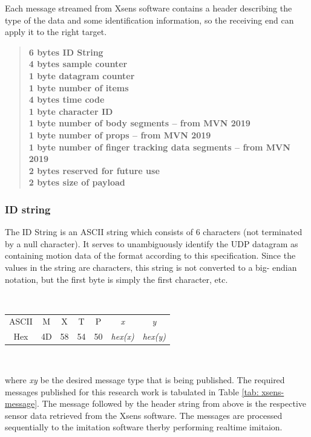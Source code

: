 Each message streamed from Xsens software contains a header describing the type of the data and some identification information, so the receiving end can apply it to the right target.

\begin{quote}
    \textbf{
    6 bytes ID String \\
    4 bytes sample counter \\
    1 byte datagram counter \\
    1 byte number of items \\
    4 bytes time code \\
    1 byte character ID \\
    1 byte number of body segments – from MVN 2019 \\
    1 byte number of props – from MVN 2019 \\
    1 byte number of finger tracking data segments – from MVN 2019 \\
    2 bytes reserved for future use \\
    2 bytes size of payload}
\end{quote}

\subsubsection{ID string}

The ID String is an ASCII string which consists of 6 characters (not terminated by a null character). It serves to unambiguously identify the UDP datagram as containing motion data of the 
format according to this specification. Since the values in the string are characters, this string is not converted to a big- endian notation, but the first byte is simply the first character, etc.

~

\begin{tabular}{ccccccc}
    ASCII & M & X & T & P & \textit{x} & \textit{y} \\
    Hex & 4D & 58 & 54 & 50 & \textit{hex(x)} & \textit{hex(y)} \\
\end{tabular}

~

where \textit{xy} be the desired message type that is being published. The required messages published for this research work is tabulated in Table \ref{tab: xsens-message}. The message followed by the 
header string from above is the respective sensor data retrieved from the Xsens software. The messages are processed sequentially to the imitation software therby performing realtime imitaion.


